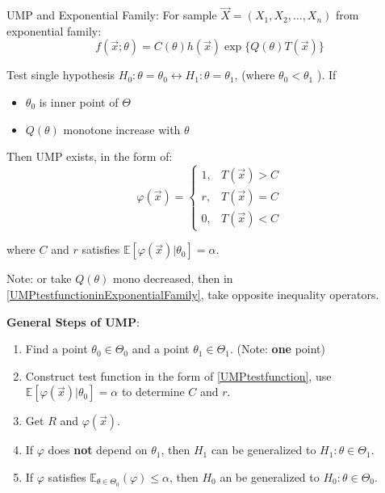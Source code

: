     UMP and Exponential Family: For sample $\vec{X}=(X_1,X_2,\dots,X_n)$ from exponential family:
    \begin{equation}
    f(\vec{x};\theta)=C(\theta)h(\vec{x})\exp\{Q(\theta)T(\vec{x})\}    
    \end{equation}

    Test single hypothesis $H_0:\theta=\theta_0\longleftrightarrow H_1:\theta=\theta_1$, (where $ \theta_0<\theta_1 $ ).
    If 
    \begin{itemize}[topsep=0.5pt,itemsep=0pt]
        \item $\theta_0$ is inner point of $\Theta$
        \item $Q(\theta)$  monotone increase with $\theta$
    \end{itemize}

    Then UMP exists, in the form of:
    \begin{equation}\label{UMPtestfunctioninExponentialFamily}
            \varphi(\vec{x})=\begin{cases}
        1,&T(\vec{x})>C\\
        r,&T(\vec{x})=C\\
        0,&T(\vec{x})<C
    \end{cases} 
    \end{equation}
   
    

    where $C$ and $r$ satisfies $\mathbb{E}[\varphi(\vec{x})|\theta_0]=\alpha$.

    Note: or take $Q(\theta)$ mono decreased, then in \autoref{UMPtestfunctioninExponentialFamily}, take opposite inequality operators.
    
\begin{point}
    \textbf{General Steps of UMP}:
\end{point}

    
    \begin{enumerate}[topsep=2pt,itemsep=2pt]
        \item Find a point $\theta_0\in\Theta_0$ and a point $\theta_1\in\Theta_1$. (Note: \textbf{one} point)
        \item Construct test function in the form of {\autoref{UMPtestfunction}}, use $\mathbb{E}[\varphi(\vec{x})|\theta_0]=\alpha$ to determine $C$ and $r$.
        \item Get $R$ and $\varphi(\vec{x})$.
        \item If $\varphi$ does \textbf{not} depend on $\theta_1$, then $H_1$ can be generalized to $H_1:\theta\in\Theta_1$.
        \item If $\varphi$ satisfies $\mathbb{E}_{\theta\in\Theta_0}(\varphi)\leq\alpha$, then $H_0$ an be generalized to $H_0:\theta\in\Theta_0$.
    \end{enumerate}

